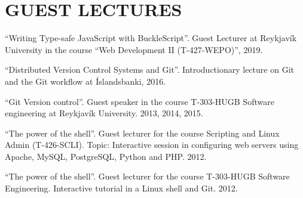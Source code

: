 \section{GUEST LECTURES}

``Writing Type-safe JavaScript with BuckleScript''. Guest Lecturer at Reykjavík University in the course ``Web Development II (T-427-WEPO)'', 2019.

``Distributed Version Control Systems and Git''. Introductionary lecture on Git and the Git workflow at Íslandsbanki, 2016.

``Git Version control''. Guest speaker in the course T-303-HUGB Software engineering at Reykjavík University. 2013, 2014, 2015.

``The power of the shell''. Guest lecturer for the course Scripting and Linux Admin (T-426-SCLI). Topic: Interactive session in configuring web servers using Apache, MySQL, PostgreSQL, Python and PHP. 2012.

``The power of the shell''. Guest lecturer for the course T-303-HUGB Software Engineering. Interactive tutorial in a Linux shell and Git. 2012.

